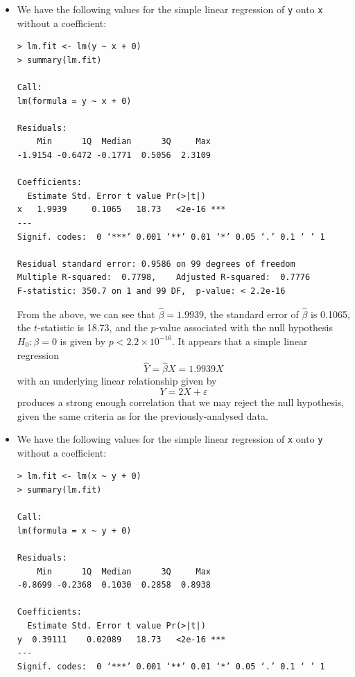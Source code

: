 \begin{itemize}
    \item[(a)] We have the following values for the simple linear regression of
        \verb|y| onto \verb|x| without a coefficient:
        \begin{lstlisting}
> lm.fit <- lm(y ~ x + 0)
> summary(lm.fit)

Call:
lm(formula = y ~ x + 0)

Residuals:
    Min      1Q  Median      3Q     Max
-1.9154 -0.6472 -0.1771  0.5056  2.3109

Coefficients:
  Estimate Std. Error t value Pr(>|t|)
x   1.9939     0.1065   18.73   <2e-16 ***
---
Signif. codes:  0 ‘***’ 0.001 ‘**’ 0.01 ‘*’ 0.05 ‘.’ 0.1 ‘ ’ 1

Residual standard error: 0.9586 on 99 degrees of freedom
Multiple R-squared:  0.7798,    Adjusted R-squared:  0.7776
F-statistic: 350.7 on 1 and 99 DF,  p-value: < 2.2e-16
        \end{lstlisting}
        From the above, we can see that $\hat{\beta} = 1.9939$, the standard error
        of $\hat{\beta}$ is 0.1065, the $t$-statistic is 18.73, and the $p$-value
        associated with the null hypothesis $H_0 : \beta = 0$ is given by
        $p < 2.2 \times 10^{-16}$. It appears that a simple linear regression
        \[
            \hat{Y} = \hat{\beta} X = 1.9939X
        \]
        with an underlying linear relationship given by
        \[
            Y = 2X + \varepsilon
        \]
        produces a strong enough correlation that we may reject the null hypothesis,
        given the same criteria as for the previously-analysed
        data.
    \item[(b)] We have the following values for the simple linear regression of
        \verb|x| onto \verb|y| without a coefficient:
        \begin{lstlisting}
> lm.fit <- lm(x ~ y + 0)
> summary(lm.fit)

Call:
lm(formula = x ~ y + 0)

Residuals:
    Min      1Q  Median      3Q     Max
-0.8699 -0.2368  0.1030  0.2858  0.8938

Coefficients:
  Estimate Std. Error t value Pr(>|t|)
y  0.39111    0.02089   18.73   <2e-16 ***
---
Signif. codes:  0 ‘***’ 0.001 ‘**’ 0.01 ‘*’ 0.05 ‘.’ 0.1 ‘ ’ 1


\end{lstlisting}
\end{itemize}
